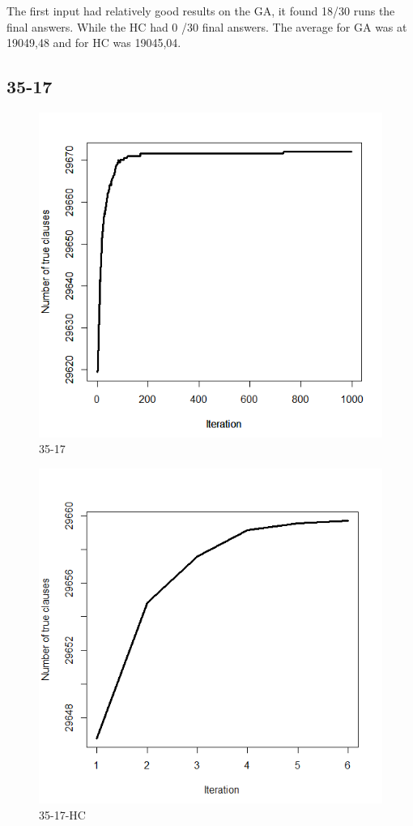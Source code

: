 \documentclass{article}
\begin{document}
The first input had relatively good results on the GA, it found 18/30 runs the final answers. While the HC had 0 /30 final answers. The average for GA was at 19049,48 and for HC was 19045,04.



\subsection{35-17}
\begin{figure}[H]
  \includegraphics[width=\linewidth]{35-17.png}
  \caption{35-17}
\end{figure}
\begin{figure}[H]
  \includegraphics[width=\linewidth]{35-17-HC.png}
  \caption{35-17-HC}
\end{figure}
\end{document}
